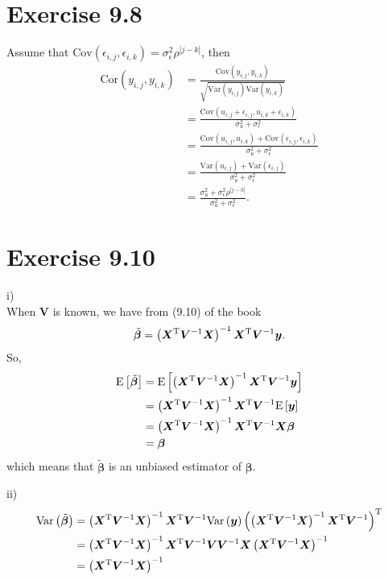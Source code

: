 \documentclass[a4paper]{article}
\newcommand{\E}{\mathrm{E}}
\newcommand{\Var}{\mathrm{Var}}
\newcommand{\Cov}{\mathrm{Cov}}
\newcommand{\Cor}{\mathrm{Cor}}
\begin{document}
\vspace{\baselineskip}
\section{Exercise 9.8}
Assume that $\Cov(\epsilon_{i,j},\epsilon_{i,k}) = \sigma_{\epsilon}^{2}\rho^{|j-k|}$, then
\begin{align*}
\Cor(y_{i,j},y_{i,k}) &= \frac{\Cov(y_{i,j},y_{i,k})}{\sqrt{\Var(y_{i,j})\Var(y_{i,k})}}\\
&= \frac{\Cov(u_{i,j} + \epsilon_{i,j}, u_{i,k}+\epsilon_{i,k})}{\sigma_{u}^{2}+\sigma_{\epsilon}^{2}}\\
&= \frac{\Cov(u_{i,j}, u_{i,k}) + \Cov(\epsilon_{i,j}, \epsilon_{i,k})}{\sigma_{u}^{2}+\sigma_{\epsilon}^{2}}\\
&= \frac{\Var(u_{i,j}) + \Var(\epsilon_{i,j})}{\sigma_{u}^{2}+\sigma_{\epsilon}^{2}}\\
&= \frac{\sigma_{u}^{2} + \sigma_{\epsilon}^{2}\rho^{|j-k|}}{\sigma_{u}^{2}+\sigma_{\epsilon}^{2}}.
\end{align*}



\vspace{\baselineskip}
\section{Exercise 9.10}
i)\\
When $\bm{V}$ is known, we have from (9.10) of the book
\begin{align*}
\tilde{\bm{\beta}} = \left(\bm{X}^{\rm T}\bm{V}^{-1}\bm{X}\right)^{-1}\bm{X}^{\rm T}\bm{V}^{-1}\bm{y}.
\end{align*}
So,
\begin{align*}
\E\left[\tilde{\bm{\beta}}\right] &= \E\left[\left(\bm{X}^{\rm T}\bm{V}^{-1}\bm{X}\right)^{-1}\bm{X}^{\rm T}\bm{V}^{-1}\bm{y}\right]\\
&= \left(\bm{X}^{\rm T}\bm{V}^{-1}\bm{X}\right)^{-1}\bm{X}^{\rm T}\bm{V}^{-1}\E\left[\bm{y}\right]\\
&= \left(\bm{X}^{\rm T}\bm{V}^{-1}\bm{X}\right)^{-1}\bm{X}^{\rm T}\bm{V}^{-1}\bm{X}\bm{\beta}\\
&= \bm{\beta}
\end{align*}
which means that $\tilde{\bm{\beta}}$ is an unbiased estimator of $\bm{\beta}$.

ii)
\begin{align*}
\Var\left(\tilde{\bm{\beta}}\right) &= \left(\bm{X}^{\rm T}\bm{V}^{-1}\bm{X}\right)^{-1}\bm{X}^{\rm T}\bm{V}^{-1}\Var\left(\bm{y}\right)\left(\left(\bm{X}^{\rm T}\bm{V}^{-1}\bm{X}\right)^{-1}\bm{X}^{\rm T}\bm{V}^{-1}\right)^{\rm T}\\
&= \left(\bm{X}^{\rm T}\bm{V}^{-1}\bm{X}\right)^{-1}\bm{X}^{\rm T}\bm{V}^{-1}\bm{V}\bm{V}^{-1}\bm{X}\left(\bm{X}^{\rm T}\bm{V}^{-1}\bm{X}\right)^{-1}\\
&= \left(\bm{X}^{\rm T}\bm{V}^{-1}\bm{X}\right)^{-1}
\end{align*}
\end{document}
